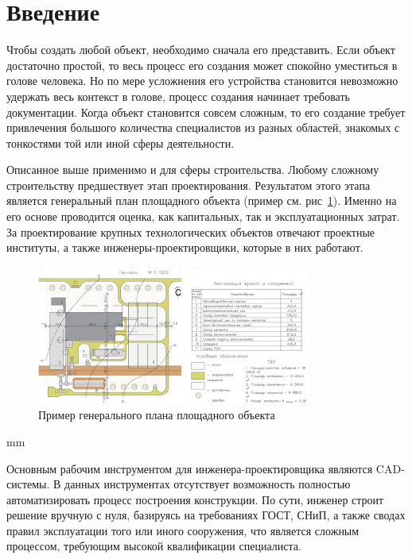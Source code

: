 \section*{\Large{Введение}}


Чтобы создать любой объект, необходимо сначала его представить.
Если объект достаточно простой, то весь процесс его создания может спокойно уместиться в голове человека.
Но по мере усложнения его устройства становится невозможно удержать весь контекст в голове,
процесс создания начинает требовать документации.
Когда объект становится совсем сложным, то его создание требует привлечения большого количества специалистов из разных
областей, знакомых с тонкостями той или иной сферы деятельности.

Описанное выше применимо и для сферы строительства.
Любому сложному строительству предшествует этап проектирования.
Результатом этого этапа является генеральный план площадного объекта (пример см. рис\ \ref{pic:introduction__site-plan}).
Именно на его основе проводится оценка, как капитальных, так и эксплуатационных затрат.
За проектирование крупных технологических объектов отвечают проектные институты,
а также инженеры-проектировщики, которые в них работают.

\begin{figure}[H]
	\vspace*{-0.4 cm}
	\includegraphics[width=0.8\textwidth]{introduction/pictures/site_plan}
	\caption{Пример генерального плана площадного объекта}
	\label{pic:introduction__site-plan}
\end{figure}
 mm

Основным рабочим инструментом для инженера-проектировщика являются CAD-системы.
В данных инструментах отсутствует возможность полностью автоматизировать процесс построения конструкции.
По сути, инженер строит решение вручную с нуля, базируясь на требованиях ГОСТ, СНиП, а также сводах правил
эксплуатации того или иного сооружения, что является сложным процессом, требующим высокой квалификации специалиста.
